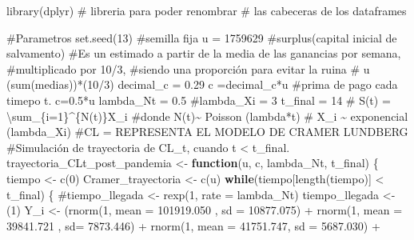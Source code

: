 \documentclass[
  us-letterpaper,
]{scrreprt}
\newenvironment{Shaded}{\begin{snugshade}}{\end{snugshade}}
\newcommand{\AttributeTok}[1]{\textcolor[rgb]{0.40,0.45,0.13}{#1}}
\newcommand{\CommentTok}[1]{\textcolor[rgb]{0.37,0.37,0.37}{#1}}
\newcommand{\ControlFlowTok}[1]{\textcolor[rgb]{0.00,0.23,0.31}{\textbf{#1}}}
\newcommand{\DecValTok}[1]{\textcolor[rgb]{0.68,0.00,0.00}{#1}}
\newcommand{\FloatTok}[1]{\textcolor[rgb]{0.68,0.00,0.00}{#1}}
\newcommand{\FunctionTok}[1]{\textcolor[rgb]{0.28,0.35,0.67}{#1}}
\newcommand{\NormalTok}[1]{\textcolor[rgb]{0.00,0.23,0.31}{#1}}
\newcommand{\OtherTok}[1]{\textcolor[rgb]{0.00,0.23,0.31}{#1}}
\newcommand{\SpecialCharTok}[1]{\textcolor[rgb]{0.37,0.37,0.37}{#1}}
\theoremstyle{plain}
\theoremstyle{plain}
\theoremstyle{definition}
\theoremstyle{remark}
\begin{document}
\begin{Shaded}
\begin{Highlighting}[]
\FunctionTok{library}\NormalTok{(dplyr) }\CommentTok{\# libreria para poder renombrar }
\CommentTok{\# las cabeceras de los dataframes}

\CommentTok{\#Parametros}
\FunctionTok{set.seed}\NormalTok{(}\DecValTok{13}\NormalTok{) }\CommentTok{\#semilla fija}
\NormalTok{u }\OtherTok{=} \DecValTok{1759629} \CommentTok{\#surplus(capital inicial de salvamento)}
\CommentTok{\#Es un estimado a partir de la media de las ganancias por semana, }
\CommentTok{\#multiplicado por 10/3, }
\CommentTok{\#siendo una proporción para evitar la ruina}
\CommentTok{\# u (sum(medias))*(10/3)}
\NormalTok{decimal\_c }\OtherTok{=} \FloatTok{0.29}
\NormalTok{c }\OtherTok{=}\NormalTok{decimal\_c}\SpecialCharTok{*}\NormalTok{u }\CommentTok{\#prima de pago cada timepo t. c=0.5*u}
\NormalTok{lambda\_Nt }\OtherTok{=} \FloatTok{0.5}
\CommentTok{\#lambda\_Xi = 3}
\NormalTok{t\_final }\OtherTok{=} \DecValTok{14}
\CommentTok{\# S(t) = \textbackslash{}sum\_\{i=1\}\^{}\{N(t)\}X\_i}
\CommentTok{\#donde N(t)\textasciitilde{} Poisson (lambda*t)}
\CommentTok{\# X\_i \textasciitilde{} exponencial (lambda\_Xi)}
\CommentTok{\#CL = REPRESENTA EL MODELO DE CRAMER LUNDBERG}
\CommentTok{\#Simulación de trayectoria de CL\_t, cuando t \textless{} t\_final.}
\NormalTok{trayectoria\_CLt\_post\_pandemia }\OtherTok{\textless{}{-}} \ControlFlowTok{function}\NormalTok{(u, c, lambda\_Nt, t\_final)}
\NormalTok{\{}
\NormalTok{  tiempo }\OtherTok{\textless{}{-}} \FunctionTok{c}\NormalTok{(}\DecValTok{0}\NormalTok{)}
\NormalTok{  Cramer\_trayectoria }\OtherTok{\textless{}{-}} \FunctionTok{c}\NormalTok{(u)}
  \ControlFlowTok{while}\NormalTok{(tiempo[}\FunctionTok{length}\NormalTok{(tiempo)] }\SpecialCharTok{\textless{}}\NormalTok{ t\_final)}
\NormalTok{  \{}
    \CommentTok{\#tiempo\_llegada \textless{}{-} rexp(1, rate = lambda\_Nt)}
\NormalTok{    tiempo\_llegada }\OtherTok{\textless{}{-}}\NormalTok{ (}\DecValTok{1}\NormalTok{)}
\NormalTok{    Y\_i }\OtherTok{\textless{}{-}}\NormalTok{  (}\FunctionTok{rnorm}\NormalTok{(}\DecValTok{1}\NormalTok{, }\AttributeTok{mean =} \FloatTok{101919.050}\NormalTok{ , }\AttributeTok{sd =} \FloatTok{10877.075}\NormalTok{) }\SpecialCharTok{+} 
              \FunctionTok{rnorm}\NormalTok{(}\DecValTok{1}\NormalTok{, }\AttributeTok{mean =}  \FloatTok{39841.721}\NormalTok{ , }\AttributeTok{sd=} \FloatTok{7873.446}\NormalTok{)  }\SpecialCharTok{+}  
              \FunctionTok{rnorm}\NormalTok{(}\DecValTok{1}\NormalTok{, }\AttributeTok{mean =}   \FloatTok{41751.747}\NormalTok{, }\AttributeTok{sd =} \FloatTok{5687.030}\NormalTok{) }\SpecialCharTok{+} 

\end{Highlighting}
\end{Shaded}
\end{document}
